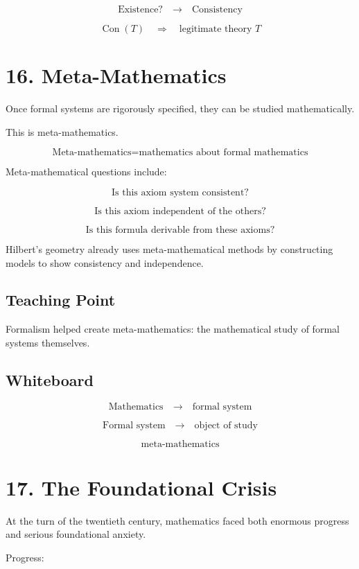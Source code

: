 \documentclass[11pt]{article}
\begin{document}
\[
\text{Existence?}
\quad \longrightarrow \quad
\text{Consistency}
\]

\[
\operatorname{Con}(T)
\quad \Rightarrow \quad
\text{legitimate theory }T
\]

\section*{16. Meta-Mathematics}

Once formal systems are rigorously specified, they can be studied mathematically.

This is meta-mathematics.

\[
\boxed{
\text{Meta-mathematics} = \text{mathematics about formal mathematics}
}
\]

Meta-mathematical questions include:

\[
\text{Is this axiom system consistent?}
\]

\[
\text{Is this axiom independent of the others?}
\]

\[
\text{Is this formula derivable from these axioms?}
\]

Hilbert's geometry already uses meta-mathematical methods by constructing models to
show consistency and independence.

\subsection*{Teaching Point}

Formalism helped create meta-mathematics: the mathematical study of formal systems
themselves.

\subsection*{Whiteboard}

\[
\text{Mathematics}
\quad \longrightarrow \quad
\text{formal system}
\]

\[
\text{Formal system}
\quad \longrightarrow \quad
\text{object of study}
\]

\[
\text{meta-mathematics}
\]

\section*{17. The Foundational Crisis}

At the turn of the twentieth century, mathematics faced both enormous progress and
serious foundational anxiety.

Progress:
\end{document}
